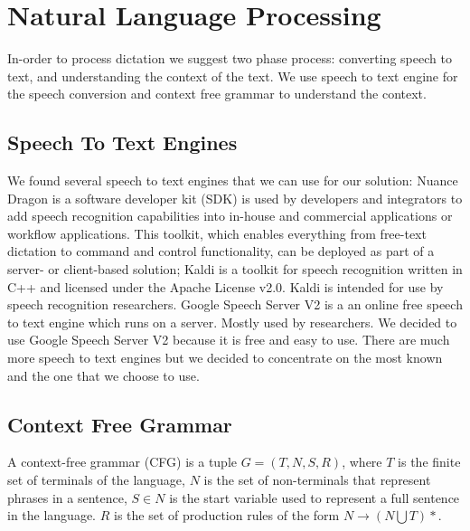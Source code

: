 \section{Natural Language Processing}
In-order to process dictation we suggest two phase process: converting speech to text, and understanding the context of the text. We use speech to text engine for the speech conversion and context free grammar to understand the  context.
\subsection{Speech To Text Engines}
We found several speech to text engines that we can use for our solution: Nuance Dragon \citet{Nuance14} is a software developer kit (SDK) is used by developers and integrators to add speech recognition capabilities into in-house and commercial applications or workflow applications. This toolkit, which enables everything from free-text dictation to command and control functionality, can be deployed as part of a server- or client-based solution; Kaldi \citet{Pove_ASRU2011} is a toolkit for speech recognition written in C++ and licensed under the Apache License v2.0. Kaldi is intended for use by speech recognition researchers. Google Speech Server V2 \citet{google15} is a an online free speech to text engine which runs on a server. Mostly used by researchers. We decided to use Google Speech Server V2 because it is free and easy to use. There are much more speech to text engines but we decided to concentrate on the most known and the one that we choose to use.
\subsection{Context Free Grammar}
A context-free grammar (CFG) is a tuple $ G=(T,N,S,R) $, where $ T $ is the finite set of  terminals of the language, $ N $ is the set of non-terminals that represent phrases in a sentence, $ S \in N $ is the start variable used to represent a full sentence in the language. $ R $ is the set of production rules of the form $ N \rightarrow (N \bigcup T)* $.
